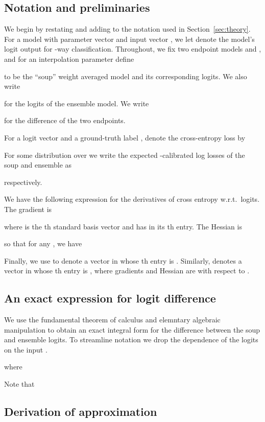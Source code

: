 \newcommand{\ones}{\mathbf{1}}
\newcommand{\sbv}[1]{e^{(#1)}}

\subsection{Notation and preliminaries}
We begin by restating and adding to the notation used in Section~\ref{sec:theory}.
For a model with parameter vector  and input vector , we let  denote the model's logit output for -way classification. Throughout, we fix two endpoint models  and , and for an interpolation parameter  define

to be the ``soup'' weight averaged model and its corresponding logits. We also write

for the logits of the ensemble model. We write

for the difference of the two endpoints.

For a logit vector  and a ground-truth label , denote the cross-entropy loss by

For some distribution over  we write the expected -calibrated log losses of the soup and ensemble as

respectively.

We have the following expression for the derivatives of cross entropy w.r.t.\ logits. The gradient is

where  is the th standard basis vector and  has  in its th entry. The Hessian is

so that for any , we have


Finally, we use  to denote a vector in  whose th entry is . Similarly, 
   denotes a vector in  whose th entry is , where gradients and Hessian are with respect to . 




\subsection{An exact expression for logit difference}
We use the fundamental theorem of calculus and elemntary algebraic manipulation to obtain an exact integral form for the difference between the soup and ensemble logits. To streamline notation we drop the dependence of the logits on the input .


where

Note that


\subsection{Derivation of approximation}\label{app:theory-deriv}

